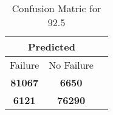 \begin{table}[] 
\label{Table: Prediction Accuracy-DMD92.5OnlySunEKF-ignoreReflection-Reflection} 
\caption{Confusion Matric for 92.5} 
\centering 
\begin{tabular} 
 {@{}ccc@{}} 
\toprule 
\multicolumn{2}{c}{\textbf{Predicted}}
 \\ \midrule 
\multicolumn{1}{|c|}{Failure} & 
\multicolumn{1}{c|}{No Failure}
 \\ \midrule 
\multicolumn{1}{|c|}{\color{green}\textbf{81067}} & 
\multicolumn{1}{c|}{\color{red}\textbf{6650}}
 \\ \midrule 
\multicolumn{1}{|c|}{\color{red}\textbf{6121}} & 
\multicolumn{1}{c|}{\color{green}\textbf{76290}}
 \\ \bottomrule 
\end{tabular} 
\end{table} 
